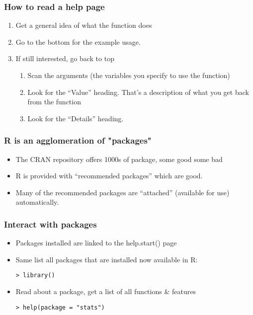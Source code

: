 \documentclass[11pt,canadian,english]{beamer}
\begin{document}
\begin{frame}[containsverbatim]
\frametitle{How to read a help page}
\begin{enumerate}
\item Get a general idea of what the function does
\item Go to the bottom for the example usage. 
\item If still interested, go back to top

\begin{enumerate}
\item Scan the arguments (the variables you specify to use the function)
\item Look for the ``Value'' heading. That's a description of what you
get back from the function
\item Look for the ``Details'' heading.
\end{enumerate}
\end{enumerate}
\end{frame}

\begin{frame}[containsverbatim]
\frametitle{R is an agglomeration of "packages"}
\begin{itemize}
\item The CRAN repository offers 1000s of package, some good some bad
\item R is provided with ``recommended packages'' which are good.
\item Many of the recommended packages are ``attached'' (available for
use) automatically.
\end{itemize}
\end{frame}

\begin{frame}[containsverbatim]
\frametitle{Interact with packages}
\begin{itemize}
\item Packages installed are linked to the help.start() page
\item Same list all packages that are installed now available in R:


\begin{lstlisting}
> library()
\end{lstlisting}


\item Read about a package, get a list of all functions \& features


\begin{lstlisting}
> help(package = "stats")
\end{lstlisting}


\end{itemize}
\end{frame}
\end{document}
